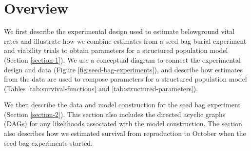 \documentclass[12pt, oneside, titlepage]{article}   	%
\begin{document}
\fi




%



\section*{Overview}

We first describe the experimental design used to estimate belowground vital rates and illustrate how we combine estimates from a seed bag burial experiment and viability trials to obtain parameters for a structured population model (Section \ref{section-1}). We use a conceptual diagram to connect the experimental design and data (Figure \ref{fig:seed-bag-experiments}), and describe how estimates from the data are used to compose parameters for a structured population model (Tables \ref{tab:survival-functions} and \ref{tab:structured-parameters}).

We then describe the data and model construction for the seed bag experiment (Section \ref{section-2}). This section also includes the directed acyclic graphs (DAGs) for any likelihoods associated with the model construction. The section also describes how we estimated survival from reproduction to October when the seed bag experiments started. 
\end{document}
